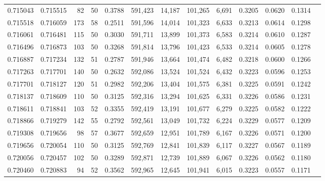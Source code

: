 \begin{tabular}{rrrrrrrrrrrrr}
0.715043 & 0.715515 &    82 &  50 &                                     0.3788 & 591,423 &  14,187 & 101,265 &   6,691 & 0.3205 & 0.0620 & 0.1314 \\
0.715518 & 0.716059 &   173 &  58 &                                     0.2511 & 591,596 &  14,014 & 101,323 &   6,633 & 0.3213 & 0.0614 & 0.1298 \\
0.716061 & 0.716481 &   115 &  50 &                                     0.3030 & 591,711 &  13,899 & 101,373 &   6,583 & 0.3214 & 0.0610 & 0.1287 \\
0.716496 & 0.716873 &   103 &  50 &                                     0.3268 & 591,814 &  13,796 & 101,423 &   6,533 & 0.3214 & 0.0605 & 0.1278 \\
0.716887 & 0.717234 &   132 &  51 &                                     0.2787 & 591,946 &  13,664 & 101,474 &   6,482 & 0.3218 & 0.0600 & 0.1266 \\
0.717263 & 0.717701 &   140 &  50 &                                     0.2632 & 592,086 &  13,524 & 101,524 &   6,432 & 0.3223 & 0.0596 & 0.1253 \\
0.717701 & 0.718127 &   120 &  51 &                                     0.2982 & 592,206 &  13,404 & 101,575 &   6,381 & 0.3225 & 0.0591 & 0.1242 \\
0.718137 & 0.718609 &   110 &  50 &                                     0.3125 & 592,316 &  13,294 & 101,625 &   6,331 & 0.3226 & 0.0586 & 0.1231 \\
0.718611 & 0.718841 &   103 &  52 &                                     0.3355 & 592,419 &  13,191 & 101,677 &   6,279 & 0.3225 & 0.0582 & 0.1222 \\
0.718866 & 0.719279 &   142 &  55 &                                     0.2792 & 592,561 &  13,049 & 101,732 &   6,224 & 0.3229 & 0.0577 & 0.1209 \\
0.719308 & 0.719656 &    98 &  57 &                                     0.3677 & 592,659 &  12,951 & 101,789 &   6,167 & 0.3226 & 0.0571 & 0.1200 \\
0.719656 & 0.720054 &   110 &  50 &                                     0.3125 & 592,769 &  12,841 & 101,839 &   6,117 & 0.3227 & 0.0567 & 0.1189 \\
0.720056 & 0.720457 &   102 &  50 &                                     0.3289 & 592,871 &  12,739 & 101,889 &   6,067 & 0.3226 & 0.0562 & 0.1180 \\
0.720460 & 0.720883 &    94 &  52 &                                     0.3562 & 592,965 &  12,645 & 101,941 &   6,015 & 0.3223 & 0.0557 & 0.1171 \\

\end{tabular}
